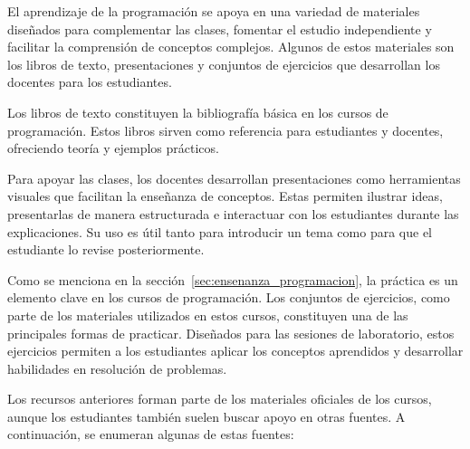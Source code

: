 \documentclass{article}
\begin{document}
El aprendizaje de la programación se apoya en una variedad de materiales diseñados para complementar las clases, fomentar el estudio independiente y facilitar la comprensión de conceptos complejos. Algunos de estos materiales son los libros de texto, presentaciones y conjuntos de ejercicios que desarrollan los docentes para los estudiantes.

Los libros de texto constituyen la bibliografía básica en los cursos de programación. Estos libros sirven como referencia para estudiantes y docentes, ofreciendo teoría y ejemplos prácticos.

Para apoyar las clases, los docentes desarrollan presentaciones como herramientas visuales que facilitan la enseñanza de conceptos. Estas permiten ilustrar ideas, presentarlas de manera estructurada e interactuar con los estudiantes durante las explicaciones. Su uso es útil tanto para introducir un tema como para que el estudiante lo revise posteriormente.  

Como se menciona en la sección~\ref{sec:ensenanza_programacion}, la práctica es un elemento clave en los cursos de programación. Los conjuntos de ejercicios, como parte de los materiales utilizados en estos cursos, constituyen una de las principales formas de practicar. Diseñados para las sesiones de laboratorio, estos ejercicios permiten a los estudiantes aplicar los conceptos aprendidos y desarrollar habilidades en resolución de problemas.

Los recursos anteriores forman parte de los materiales oficiales de los cursos, aunque los estudiantes también suelen buscar apoyo en otras fuentes. A continuación, se enumeran algunas de estas fuentes:
\end{document}
